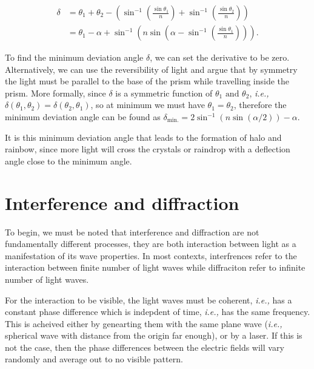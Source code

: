 \documentclass[english,a4paper,12pt]{report}
\begin{document}
\begin{equation}
    \begin{aligned} 
    \delta &= \theta _{1} + \theta _{2} - \left( \sin ^{-1} \left( \frac{\sin \theta _{1} }{n}  \right) + \sin ^{-1} \left( \frac{\sin \theta _{2} }{n}  \right)\right) \\
    &= \theta _{1} - \alpha + \sin ^{-1} \left( n\sin \left( \alpha - \sin ^{-1} \left( \frac{\sin \theta _{1} }{n}  \right) \right) \right). 
    \end{aligned} 
\end{equation}

To find the minimum deviation angle \(\delta \), we can set the derivative to be zero. Alternatively, we can use the reversibility of light and argue that by symmetry the light must be parallel to the base of the prism while travelling inside the prism. More formally, since \(\delta \) is a symmetric function of \(\theta _{1} \text { and } \theta _{2}  \), \textit{i.e.,} \(\delta (\theta _{1}, \theta _{2}  ) = \delta (\theta _{2}, \theta _{1}  )\), so at minimum we must have \(\theta _{1} = \theta _{2}  \), therefore the minimum deviation angle can be found as \(\delta _{\text{min.} } = 2 \sin ^{-1} (n \sin (\alpha /2)) - \alpha  \). 

It is this minimum deviation angle that leads to the formation of halo and rainbow, since more light will cross the crystals or raindrop with a deflection angle close to the minimum angle.



\chapter{Interference and diffraction}

To begin, we must be noted that interference and diffraction are not fundamentally different processes, they are both interaction between light as a manifestation of its wave properties. In most contexts, interfrences refer to the interaction between finite number of light waves while diffraciton refer to infinite number of light waves.

For the interaction to be visible, the light waves must be coherent, \textit{i.e.,} has a constant phase difference which is indepdent of time, \textit{i.e.,} has the same frequency. This is acheived either by genearting them with the same plane wave (\textit{i.e.,} spherical wave with distance from the origin far enough), or by a laser. If this is not the case, then the phase differences between the electric fields will vary randomly and average out to no visible pattern.
\end{document}
